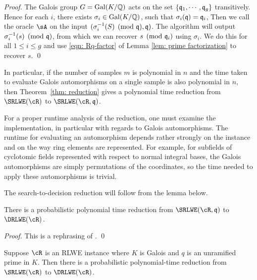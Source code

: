 \documentclass[envcountsame]{llncs}
\begin{document}
\begin{proof}
        The Galois group $G =\operatorname{Gal}(K/\mathbb{Q})$ acts on the set $\{\mathfrak{q}_1, \cdots ,\mathfrak{q}_g\}$ transitively. Hence for each $i$, there exists $\sigma_i \in \operatorname{Gal}(K/\mathbb{Q})$, such that $\sigma_i(\mathfrak{q}) = \mathfrak{q}_i$, Then we call the oracle $\sA$ on the input $(\sigma_i^{-1}(S) \pmod {\mathfrak{q}}, \mathfrak{q})$. The algorithm will output $\sigma_i^{-1}(s) \pmod{\mathfrak{q}}$, from which we can recover $s \pmod{\mathfrak{q}_i}$ using $\sigma_i$.  We do this for all $1\leq i \leq g$ and use \eqref{eqn: Rq-factor} of Lemma \ref{lem: prime factorization} to recover $s$.
\qed \end{proof}

In particular, if the number of samples $m$ is polynomial in $n$ and the time taken to evaluate Galois automorphisms on a single sample is also polynomial in $n$, then Theorem~\ref{thm: reduction} gives a polynomial time reduction from $\SRLWE(\cR)$ to $\SRLWE(\cR,\fq)$.

\begin{remark}
        For a proper runtime analysis of the reduction, one must examine the implementation, in particular with regards to Galois automorphisms.
The runtime for evaluating an automorphism depends
rather strongly on the instance and on the way ring elements are represented. For example, for subfields of cyclotomic fields represented with respect to normal integral bases, the Galois automorphisms are simply permutations of the coordinates, so the time needed to apply these automorphisms is trivial.
\end{remark}


The search-to-decision reduction will follow from the lemma below.
\begin{lemma}
There is a probabilistic polynomial time reduction from $\SRLWE(\cR,\fq)$ to $\DRLWE(\cR)$.
\end{lemma}

\begin{proof}
This is a rephrasing of \cite[Lemma 5.9 and Lemma 5.12]{lyubashevsky2013ideal}.
\qed \end{proof}

\begin{corollary}\label{cor: s-to-d}
Suppose $\cR$ is an RLWE instance where $K$ is Galois and $q$ is an unramified prime in $K$. Then there is a probabilistic polynomial-time reduction from $\SRLWE(\cR)$ to $\DRLWE(\cR)$.
\end{corollary}
\end{document}
